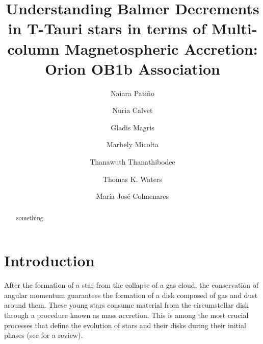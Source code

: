 \documentclass[twocolumn,linenumbers]{aastex631}
\begin{document}
\title{Understanding Balmer Decrements in T-Tauri stars in terms of Multi-column Magnetospheric Accretion: Orion OB1b Association}


\author[0009-0009-7455-6777]{Naiara Patiño}

\author[0000-0002-3950-5386]{Nuria Calvet}

\author[0000-0003-1166-5123]{Gladis Magris}

\author[0000-0001-8022-4378]{Marbely Micolta}

\author[0000-0003-4507-1710]{Thanawuth Thanathibodee}

\author[0000-0002-5231-7240]{Thomas K. Waters}

\author[0000-0002-5296-6232]{María José Colmenares}




\begin{abstract}

    something
    
\end{abstract}


\section{Introduction}

After the formation of a star from the collapse of a gas cloud, the conservation of angular momentum guarantees the formation of a disk composed of gas and dust around them. These young stars consume material from the circumstellar disk through a procedure known as mass accretion. This is among the most crucial processes that define the evolution of stars and their disks during their initial phases (see \citet{hartmann2016} for a review).
\end{document}
